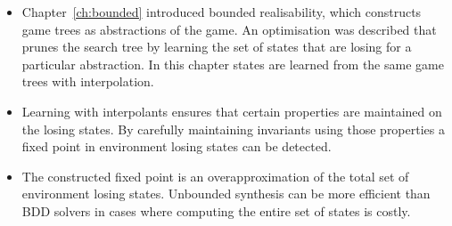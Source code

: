 \begin{itemize}
    \item Chapter~\ref{ch:bounded} introduced bounded realisability, which constructs game trees as abstractions of the game. An optimisation was described that prunes the search tree by learning the set of states that are losing for a particular abstraction. In this chapter states are learned from the same game trees with interpolation.
    \item Learning with interpolants ensures that certain properties are maintained on the losing states. By carefully maintaining invariants using those properties a fixed point in environment losing states can be detected.
    \item The constructed fixed point is an overapproximation of the total set of environment losing states. Unbounded synthesis can be more efficient than BDD solvers in cases where computing the entire set of states is costly.
\end{itemize}
